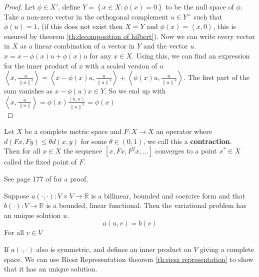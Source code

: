 \documentclass[../Main/main.tex]{subfiles}
\begin{document}
	\begin{proof}
		Let $\phi \in X'$, define $Y = \left \{ x\in X:\phi (x)=0 \right \}$ to be the null space of $\phi$. Take a non-zero vector in the orthogonal complement $u\in Y^{\bot}$ such that $\phi (u)=1$, (if this does not exist then $X=Y$ and $\phi (x) = \left \langle x, 0\right \rangle$, this is ensured by theorem \ref{th:decomposition of hilbert}). Now we can write every vector in $X$ as a linear combination of a vector in $Y$ and the vector $u$. $x = x-\phi (x) u + \phi(x) u$ for any $x \in X$. Using this, we can find an expression for the inner product of $x$ with a scaled version of $u$ \\
		$\left \langle x,\frac{u}{\left \| u \right \|^2} \right \rangle  = \left \langle x-\phi (x)u,\frac{u}{\left \| u \right \|^2} \right \rangle + \left \langle \phi (x)u,\frac{u}{\left \| u \right \|^2} \right \rangle $.
		The first part of the sum vanishes as $x - \phi (u)x \in Y$. So we end up with \\
		$\left \langle x,\frac{u}{\left \| u \right \|} \right \rangle  = \phi (x)\frac{\left \langle u,u\right \rangle}{\left \| u \right \|^2} = \phi (x)$ \\
	\end{proof}
	\begin{theorem}\label{th:Banach}
		Let $X$ be a complete metric space and $F:X\rightarrow X$ an operator where $d(Fx,Fy)\leq \theta d(x,y)$ for some $\theta \in (0,1)$, we call this a \textbf{contraction}.\\
		Then for all $x \in X$ the sequence $[x,Fx,F^2x,...]$ converges to a point $x^* \in X$ called the fixed point of $F$.
	\end{theorem}
	See page 177 of \cite{Cheney} for a proof.
	\begin{theorem}\label{th:lax milgram}
		Suppose $a(\cdot,\cdot):V \times V \rightarrow \mathbb{R}$ is a billinear, bounded and coercive form and that $b(\cdot): V \rightarrow \mathbb{R}$ is a bounded, linear functional. Then the variational problem has an unique solution $u$.
		\begin{equation}\label{eq:lax milgram}
			a(u,v)=b(v)
		\end{equation}
		For all $v \in V$
	\end{theorem}
	\begin{remark}
		If $a(\cdot,\cdot)$ also is symmetric, and defines an inner product on $V$ giving a complete space. We can use Riesz Representation theorem \ref{th:riesz representation} to show that it has an unique solution.
	\end{remark}
\end{document}
